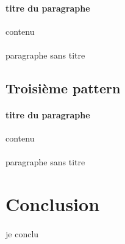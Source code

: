 \documentclass[a4paper]{article}
\begin{document}
		\paragraph{titre du paragraphe}{contenu}
		\paragraph{}{paragraphe sans titre}
		
		\subsection{Troisième pattern}
		\paragraph{titre du paragraphe}{contenu}
		\paragraph{}{paragraphe sans titre}
	
	
	\section*{Conclusion}
		\paragraph{}{je conclu}
		
\end{document}
